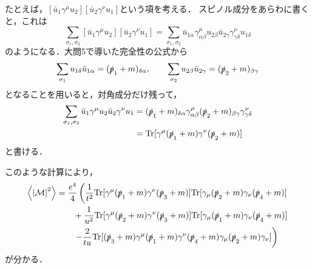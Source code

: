 たとえば，$[\bar{u}_1\gamma^{\mu} u_2][\bar{u}_2 \gamma^{\nu} u_1]$という項を考える．
スピノル成分をあらわに書くと，これは
\begin{equation}
  \sum_{\sigma_1,\sigma_2} [\bar{u}_1\gamma^{\mu} u_2][\bar{u}_2 \gamma^{\nu} u_1] = \sum_{\sigma_1,\sigma_2} \bar{u}_{1\alpha}\gamma^{\mu}_{\alpha\beta} u_{2\beta} \bar{u}_{2\gamma} \gamma^{\nu}_{\gamma\delta} u_{1\delta}
\end{equation}
のようになる．大問5で導いた完全性の公式から
\begin{equation}
  \sum_{\sigma_1} u_{1\delta} \bar{u}_{1\alpha} 
  = (\slashed{p}_1 + m)_{\delta\alpha}
  ,\qquad
  \sum_{\sigma_2} u_{2\beta} \bar{u}_{2\gamma} 
  = (\slashed{p}_2 + m)_{\beta\gamma}
\end{equation}
となることを用いると，対角成分だけ残って，
\begin{align}
  \sum_{\sigma_1,\sigma_2} \bar{u}_1\gamma^{\mu} u_2 \bar{u}_2 \gamma^{\nu} u_1 
  &= (\slashed{p}_1+m)_{\delta\alpha}\gamma^{\mu}_{\alpha\beta}(\slashed{p}_2+m)_{\beta\gamma}\gamma^{\nu}_{\gamma\delta} \notag\\
  &= \mathrm{Tr}[\gamma^{\mu}(\slashed{p}_1+m)\gamma^{\nu}(\slashed{p}_2+m)]
\end{align}
と書ける．

このような計算により，
\begin{align}
  \ev{\left|\mathcal{M}\right|^2} &= \frac{e^4}{4} \left(
    \frac{1}{t^2} \mathrm{Tr}[\gamma^{\mu}(\slashed{p}_1+m)\gamma^{\nu}(\slashed{p}_3+m)]\mathrm{Tr}[\gamma_{\mu}(\slashed{p}_2+m)\gamma_{\nu}(\slashed{p}_4+m)] \right.\notag\\
    &\qquad + \frac{1}{u^2} \mathrm{Tr}[\gamma^{\mu}(\slashed{p}_2+m)\gamma^{\nu}(\slashed{p}_3+m)]\mathrm{Tr}[\gamma_{\mu}(\slashed{p}_1+m)\gamma_{\nu}(\slashed{p}_4+m)] \notag\\
    &\qquad \left.-\frac{2}{tu} \mathrm{Tr}[(\slashed{p}_3+m)\gamma^{\mu}(\slashed{p}_1+m)\gamma^{\nu}(\slashed{p}_4+m)\gamma_{\mu}(\slashed{p}_2+m)\gamma_{\nu}] \right)
\end{align}
が分かる．

